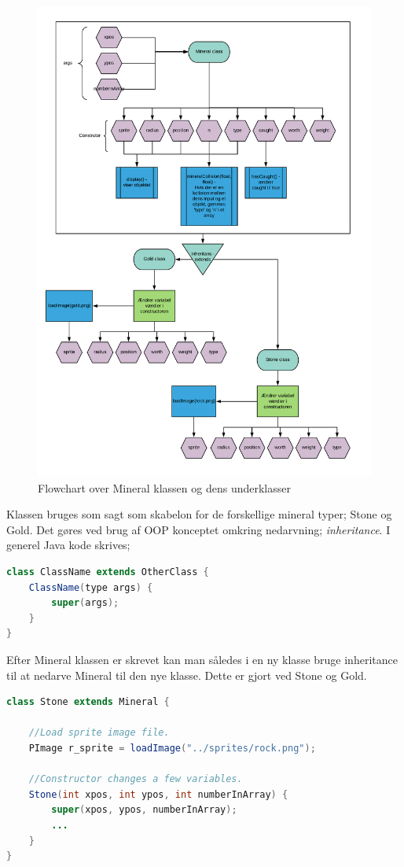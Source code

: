 \documentclass[12pt,a4paper]{article}
\begin{document}
        \begin{figure}[H]
            \centering
            \includegraphics[width=1 \textwidth]{Flowchart - Mineral}
            \caption{Flowchart over Mineral klassen og dens underklasser}
            \label{}
        \end{figure}

        Klassen bruges som sagt som skabelon for de forskellige mineral typer; Stone og Gold. Det gøres ved brug af OOP konceptet omkring nedarvning; \emph{inheritance}. I generel Java kode skrives;
        
        \begin{lstlisting}[language=Java]
class ClassName extends OtherClass {
    ClassName(type args) {
        super(args);
    }
}
\end{lstlisting}
        
        Efter Mineral klassen er skrevet kan man således i en ny klasse bruge inheritance til at nedarve Mineral til den nye klasse. Dette er gjort ved Stone og Gold. 
        \begin{lstlisting}[language=Java, caption=Stone klassen]
class Stone extends Mineral {

    //Load sprite image file.
    PImage r_sprite = loadImage("../sprites/rock.png");
                
    //Constructor changes a few variables.
    Stone(int xpos, int ypos, int numberInArray) {
        super(xpos, ypos, numberInArray);
        ...
    }
}
\end{lstlisting}
\end{document}
